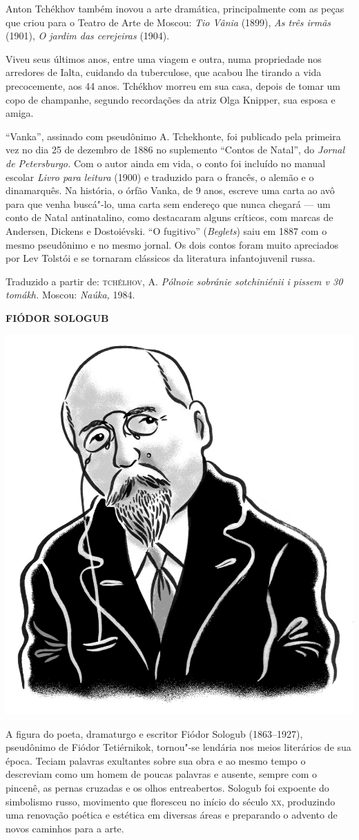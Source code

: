 Anton Tchékhov também inovou a arte dramática, principalmente com as
peças que criou para o Teatro de Arte de Moscou: \emph{Tio Vânia}
(1899), \emph{As três irmãs} (1901), \emph{O jardim das cerejeiras}
(1904).

Viveu seus últimos anos, entre uma viagem e outra, numa propriedade nos
arredores de Ialta, cuidando da tuberculose, que acabou lhe tirando a
vida precocemente, aos 44 anos. Tchékhov morreu em sua casa, depois de
tomar um copo de champanhe, segundo recordações da atriz Olga Knipper,
sua esposa e amiga.

``Vanka'', assinado com pseudônimo A. Tchekhonte, foi publicado pela
primeira vez no dia 25 de dezembro de 1886 no suplemento ``Contos de
Natal'', do \emph{Jornal de Petersburgo.} Com o autor ainda em vida, o
conto foi incluído no manual escolar \emph{Livro para leitura} (1900) e
traduzido para o francês, o alemão e o dinamarquês. Na história, o órfão
Vanka, de 9 anos, escreve uma carta ao avô para que venha buscá"-lo, uma
carta sem endereço que nunca chegará --- um conto de Natal
antinatalino, como destacaram alguns críticos, com marcas de Andersen,
Dickens e Dostoiévski. ``O fugitivo'' (\emph{Beglets}) saiu em 1887 com
o mesmo pseudônimo e no mesmo jornal. Os dois contos foram muito
apreciados por Lev Tolstói e se tornaram clássicos da literatura
infantojuvenil russa.

Traduzido a partir de:
\textsc{tchélhov}, A. \emph{Pólnoie sobránie sotchiniénii i pissem v 30 tomákh.}
Moscou: \emph{Naúka,} 1984.

\pagebreak
\noindent\textbf{FIÓDOR SOLOGUB}\medskip

\noindent\includegraphics[width=.8in]{./imgs/autor7.jpg}

\noindent{}A figura do poeta, dramaturgo e escritor Fiódor Sologub (1863--1927),
pseudônimo de Fiódor Tetiérnikok, tornou"-se lendária nos meios
literários de sua época. Teciam palavras exultantes sobre sua obra e ao
mesmo tempo o descreviam como um homem de poucas palavras e ausente,
sempre com o pincenê, as pernas cruzadas e os olhos entreabertos.
Sologub foi expoente do simbolismo russo, movimento que floresceu no início do
século \textsc{xx}, produzindo uma renovação poética e estética em diversas áreas
e preparando o advento de novos caminhos para a arte.

